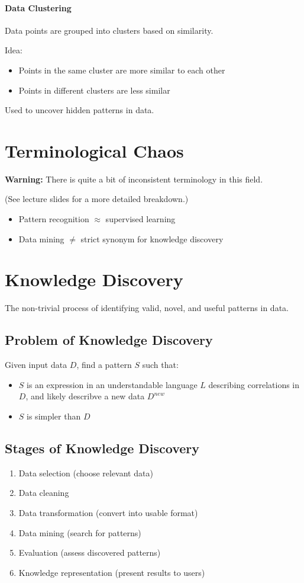 \documentclass{article}
\begin{document}
\paragraph{Data Clustering}
Data points are grouped into clusters based on similarity.

Idea:
\begin{itemize}
  \item Points in the same cluster are more similar to each other
  \item Points in different clusters are less similar
\end{itemize}

Used to uncover hidden patterns in data.

\section{Terminological Chaos}
\textbf{Warning:} There is quite a bit of inconsistent terminology in this field.

(See lecture slides for a more detailed breakdown.)

\begin{itemize}
  \item Pattern recognition $\approx$ supervised learning
  \item Data mining $\neq$ strict synonym for knowledge discovery
\end{itemize}

\section{Knowledge Discovery}
The non-trivial process of identifying valid, novel, and useful patterns in data.

\subsection{Problem of Knowledge Discovery}
Given input data $D$, find a pattern $S$ such that:
\begin{itemize}
  \item $S$ is an expression in an understandable language $L$ describing correlations in $D$, and likely describve a new data $D^{new}$
  \item $S$ is simpler than $D$
\end{itemize}

\subsection{Stages of Knowledge Discovery}
\begin{enumerate}
  \item Data selection (choose relevant data)
  \item Data cleaning
  \item Data transformation (convert into usable format)
  \item Data mining (search for patterns)
  \item Evaluation (assess discovered patterns)
  \item Knowledge representation (present results to users)
\end{enumerate}
\end{document}
